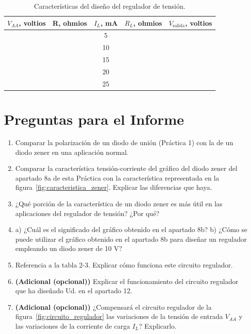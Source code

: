 \documentclass[12pt,a4paper]{article}
\begin{document}
\begin{table}[H]
    \centering
    \caption{Características del diseño del regulador de tensión.}
    \label{tab:diseno_regulador}
    \begin{tabular}{ccccc}
        \toprule
        $V_{AA}$, voltios & R, ohmios & $I_L$, mA & $R_L$, ohmios & $V_{\text{salida}}$, voltios \\
        \midrule
         & & 5 & & \\
         & & 10 & & \\
         & & 15 & & \\
         & & 20 & & \\
         & & 25 & & \\
        \bottomrule
    \end{tabular}
\end{table}

\newpage
\section*{Preguntas para el Informe}
\begin{enumerate}
    \item Comparar la polarización de un diodo de unión (Práctica 1) con la de un diodo zener en una aplicación normal.
    \item Comparar la característica tensión-corriente del gráfico del diodo zener del apartado 8a de esta Práctica con la característica representada en la figura~\ref{fig:caracteristica_zener}. Explicar las diferencias que haya.
    \item ¿Qué porción de la característica de un diodo zener es más útil en las aplicaciones del regulador de tensión? ¿Por qué?
    \item a) ¿Cuál es el significado del gráfico obtenido en el apartado 8b? b) ¿Cómo se puede utilizar el gráfico obtenido en el apartado 8b para diseñar un regulador empleando un diodo zener de 10 V?
    \item Referencia a la tabla 2-3. Explicar cómo funciona este circuito regulador.
    \item[6.] \textbf{(Adicional (opcional))} Explicar el funcionamiento del circuito regulador que ha diseñado Ud. en el apartado 12.
    \item[7.] \textbf{(Adicional (opcional))} ¿Compensará el circuito regulador de la figura~\ref{fig:circuito_regulador} las variaciones de la tensión de entrada $V_{AA}$ y las variaciones de la corriente de carga $I_L$? Explicarlo.
\end{enumerate}

\end{document}
